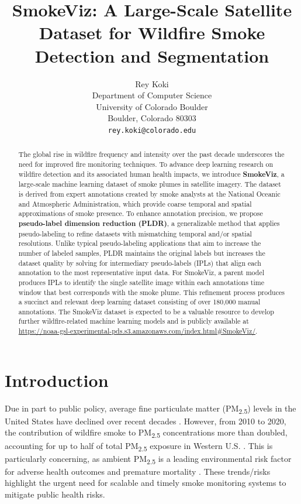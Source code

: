 \documentclass{article}
\title{SmokeViz: A Large-Scale Satellite Dataset for Wildfire Smoke Detection and Segmentation}
\author{%
  Rey Koki\\%
  Department of Computer Science\\
  University of Colorado Boulder\\
  Boulder, Colorado 80303\\
  \texttt{rey.koki@colorado.edu} \\
}
\begin{document}
\maketitle


\begin{abstract}
    The global rise in wildfire frequency and intensity over the past decade underscores the need for improved fire monitoring techniques. To advance deep learning research on wildfire detection and its associated human health impacts, we introduce \textbf{SmokeViz}, a large-scale machine learning dataset of smoke plumes in satellite imagery. The dataset is derived from expert annotations created by smoke analysts at the National Oceanic and Atmospheric Administration, which provide coarse temporal and spatial approximations of smoke presence. To enhance annotation precision, we propose \textbf{pseudo-label dimension reduction (PLDR)}, a generalizable method that applies pseudo-labeling to refine datasets with mismatching temporal and/or spatial resolutions. Unlike typical pseudo-labeling applications that aim to increase the number of labeled samples, PLDR maintains the original labels but increases the dataset quality by solving for intermediary pseudo-labels (IPLs) that align each annotation to the most representative input data. For SmokeViz, a parent model produces IPLs to identify the single satellite image within each annotations time window that best corresponds with the smoke plume. This refinement process produces a succinct and relevant deep learning dataset consisting of over 180,000 manual annotations. The SmokeViz dataset is expected to be a valuable resource to develop further wildfire-related machine learning models and is publicly available at \url{https://noaa-gsl-experimental-pds.s3.amazonaws.com/index.html#SmokeViz/}.
\end{abstract}


\section{Introduction}

Due in part to public policy, average fine particulate matter (PM\textsubscript{2.5}) levels in the United States have declined over recent decades \cite{clean_air_act}. However, from 2010 to 2020, the contribution of wildfire smoke to PM\textsubscript{2.5} concentrations more than doubled, accounting for up to half of total PM\textsubscript{2.5} exposure in Western U.S. \cite{smoke_PM}. This is particularly concerning, as ambient PM\textsubscript{2.5} is a leading environmental risk factor for adverse health outcomes and premature mortality \cite{smoke_mortality}. These trends/risks highlight the urgent need for scalable and timely smoke monitoring systems to mitigate public health risks.
\end{document}
